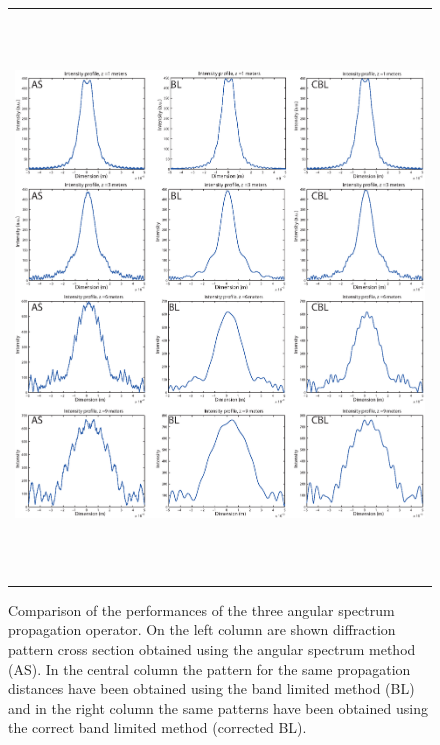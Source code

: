   \begin{figure}[H]
  	\begin{center}
  		\begin{tabular}{c}
  			\includegraphics[height=15cm]{methods1.eps}
  		\end{tabular}
  	\end{center}
  	\caption{ \label{fig:methods} 
  		Comparison of the performances of the three angular spectrum propagation operator. On the left column are shown diffraction pattern cross section obtained using the angular spectrum method (AS). In the central column the pattern for the same propagation distances have been obtained using the band limited method (BL) and in the right column the same patterns have been obtained using the correct band limited method (corrected BL). }
  \end{figure}
